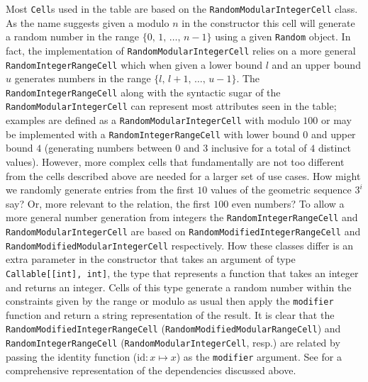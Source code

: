 Most \lstinline{Cell}s used in the  table are based on the
\lstinline{RandomModularIntegerCell} class. As the name suggests given a modulo
$n$ in the constructor this cell will generate a random number in the range $\{0,
\,1,\,\ldots,\,n - 1\}$ using a given \lstinline{Random} object. In fact, the
implementation of \lstinline{RandomModularIntegerCell} relies on a more general
\lstinline{RandomIntegerRangeCell} which when given a lower bound $l$ and an
upper bound $u$ generates numbers in the range $\{l,\,l + 1,\,\ldots,\,u - 1\}$.
The \lstinline{RandomIntegerRangeCell} along with the syntactic sugar of the
\lstinline{RandomModularIntegerCell} can represent most attributes seen in the
 table; examples are  defined as a
\lstinline{RandomModularIntegerCell} with modulo $100$ or
 may be implemented with a
\lstinline{RandomIntegerRangeCell} with lower bound $0$ and upper bound $4$
(generating numbers between $0$ and $3$ inclusive for a total of $4$ distinct
values). However, more complex cells that fundamentally are not too different
from the cells described above are needed for a larger set of use cases. How
might we randomly generate entries from the first $10$ values of the geometric
sequence $3^i$ say? Or, more relevant to the  relation, the
first $100$ even numbers? To allow a more general number generation from
integers the \lstinline{RandomIntegerRangeCell} and
\lstinline{RandomModularIntegerCell} are based on
\lstinline{RandomModifiedIntegerRangeCell} and
\lstinline{RandomModifiedModularIntegerCell} respectively. How these classes
differ is an extra parameter in the constructor that takes an argument of type
\lstinline{Callable[[int], int]}, the type that represents a function that takes an integer
and returns an integer. Cells of this type generate a random number within the
constraints given by the range or modulo as usual then apply the
\lstinline{modifier} function and return a string representation of the result.
It is clear that the \lstinline{RandomModifiedIntegerRangeCell}
(\lstinline{RandomModifiedModularRangeCell}) and
\lstinline{RandomIntegerRangeCell} (\lstinline{RandomModularIntegerCell}, resp.)
are related by passing the identity function ($\mathrm{id}: x \mapsto x$) as the
\lstinline{modifier} argument. See
 for a
comprehensive representation of the dependencies discussed above.

